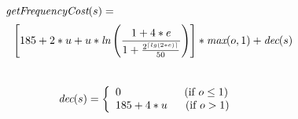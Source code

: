 \vspace{-2pt}
\[
\mt{getFrequencyCost}(s) = ~~~~~~~~~~~~~~~~~~~~~~~~~~~~~~~~~~~~~~~~~~~~~~~~ 
\vspace{-7pt}
\]
\[
~~~\left[185 + 2*u + u * \mbox{\it ln}\left(\frac{1 + 4*e}{1 + \frac{2^{\lceil lg(2*e) \rceil}}{50}}\right)\right] * \mbox{\it max}(o, 1) + \mbox{\it dec}(s)
\]
~ \vspace{-12pt} \\
\[ 
\mbox{\it dec}(s) = \left\{ \begin{array}{l}
0~~~~~~~~~~~~~\hspace{0.202in}(\mbox{if }o \le 1) \\
185+4*u~~~~~(\mbox{if }o > 1) \\
\end{array} \right.
\]
\clearpage

